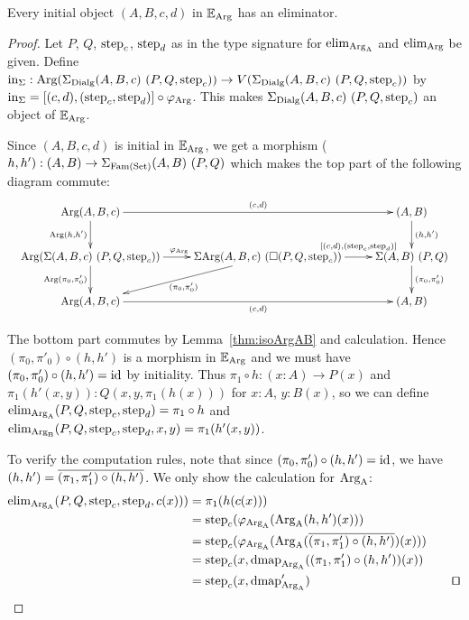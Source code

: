 \documentclass[orivec,envcountsame, ,envcountsect]{llncs}
\begin{document}
\begin{proposition}
\label{thm:init-to-elim}
Every initial object $(A, B, c, d)$ in $\mathbb{E}_{\text{Arg}}$ has an eliminator.
\end{proposition}
\begin{proof}
  Let $P$, $Q$, $\text{step}_{c}$, $\text{step}_{d}$ as in the type signature for $\text{elim}_{\text{Arg}_{\text{A}}}$
  and $\text{elim}_{\text{Arg}}$ be given. Define $\text{in}_{\Sigma} :
  \text{Arg}(\Sigma_{\text{Dialg}} (A, B, c)\ (P, Q, \text{step}_{c})) \to V(\Sigma_{\text{Dialg}}
  (A, B, c)\ (P, Q, \text{step}_{c}))$ by $\text{in}_{\Sigma} = [(c, d), (\text{step}_{c},
    \text{step}_{d})] \circ \varphi_{\text{Arg}}$. This makes
  $\Sigma_{\text{Dialg}} (A, B, c)\ (P, Q, \text{step}_{c})$ an object of
  $\mathbb{E}_{\text{Arg}}$.

  Since $(A, B, c, d)$ is initial in $\mathbb{E}_{\text{Arg}}$, we get a morphism ($h, h') :
  (A, B) \to \Sigma_{\text{Fam}(\text{Set})} (A, B)\ (P, Q)$ which makes the top part of the
  following diagram commute:
\[
\resizebox{1\textwidth}{!}{%
\xymatrix{
\ArgB(A, B, c) \ar^-{(c, d)}[rr] \ar_-{\ArgB(h, h')}[d] & & (A, B) \ar^-{(h, h')}[d] \\
\ArgB(\Sigma (A, B, c)\ (P, Q, \stepind{c})) \ar^{\varphi_{\ArgB}}[r] \ar_-{\ArgB(\pi_0, \pi'_0)}[d]
 & \Sigma \ArgB(A, B, c)\ (\BOX(P, Q, \stepind{c}))  \ar^-*+{\labelstyle \sigmamorph{(c,d)}{(\stepind{c},\stepind{d})}}[r] \ar^{(\pi_0, \pi'_0)}[dl]
 & \Sigma (A, B)\ (P, Q) \ar^-{(\pi_0, \pi'_0)}[d]\\
\ArgB(A, B, c) \ar_-{(c, d)}[rr] & & (A, B)
}
}
\]

The bottom part commutes by Lemma~\ref{thm:isoArgAB} and
calculation. Hence $(\pi_0, \pi'_0) \circ (h, h')$ is a morphism in
$\mathbb{E}_{\text{Arg}}$ and we must have $(\pi_0, \pi'_0) \circ (h, h')
= \text{id}$ by initiality. Thus $\pi_1 \circ h : (x : A) \to P(x)$ and
$\pi_1(h'(x, y)) : Q(x, y, \pi_1(h(x)))$ for $x : A$, $y : B(x)$, so
we can define $\text{elim}_{\text{Arg}_{\text{A}}}(P, Q, \text{step}_{c}, \text{step}_{d}) = \pi_1 \circ h$ and
$\text{elim}_{\text{Arg}_{\text{B}}}(P, Q, \text{step}_{c}, \text{step}_{d}, x, y) = \pi_1(h'(x, y))$. 

To verify the computation rules, note that since $(\pi_0, \pi'_0)
\circ (h, h') = \text{id}$, we have $(h, h') = \overline{(\pi_1, \pi'_1)
  \circ (h, h')}$. We only show the calculation for $\text{Arg}_{\text{A}}$:
\begin{align*}
  \elim_{\ArgA}(P, Q, \stepind{c}, \stepind{d}, c(x)))
 &= \pi_1(h(c(x))) \\
 &= \stepind{c}(\varphi_{\ArgA}(\ArgA(h, h')(x))) \\
 &= \stepind{c}(\varphi_{\ArgA}(\ArgA(\CwFsect{(\pi_1, \pi'_1) \circ (h, h')})(x))) \\
 &= \stepind{c}(x, \dmap_{\ArgA}((\pi_1, \pi'_1) \circ (h, h'))(x)) \\
 &= \stepind{c}(x, \dmap_{\ArgA}') & \text{\qed}
\end{align*}
\end{proof}
\end{document}
